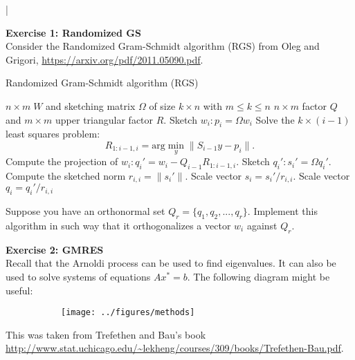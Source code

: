 \documentclass[11pt]{article}
\begin{document}
\lstset{frameround=fttt,language=Matlab}

\lstMakeShortInline[columns=fixed]|



{\bf{Exercise 1: Randomized GS}} \\

Consider the Randomized Gram-Schmidt algorithm (RGS) from Oleg and Grigori, \url{https://arxiv.org/pdf/2011.05090.pdf}.

\scriptsize
\begin{algorithm}
\caption{Randomized Gram-Schmidt algorithm (RGS)}\label{RGS}
\begin{algorithmic}
\Input $n \times m \; W$ and sketching matrix $\Omega$ of size $k \times n$ with $m \leq k \leq n$
\Output $n \times m$ factor $Q$ and $m \times m$ upper triangular factor $R$.
    \State Sketch $w_i: p_i = \Omega w_i$
    \State Solve the $k \times (i-1)$ least squares problem:
    \[ R_{1:i-1, i} = \text{arg}\min_{y} \|S_{i-1}y - p_i\|. \]
    \State Compute the projection of $w_i: q_i' = w_i - Q_{i-1}R_{1:i-1, i}$.
    \State Sketch $q_i' : s_i' = \Omega q_i'$.
    \State Compute the sketched norm $r_{i,i} = \|s_i'\|$.
    \State Scale vector $s_i = s_i'/r_{i,i}$.
    \State Scale vector $q_i = q_i'/r_{i,i}$
\EndFor
\end{algorithmic}
\end{algorithm}
\normalsize

Suppose you have an orthonormal set $Q_r = \{q_1, q_2, ..., q_r\}$. Implement this algorithm in such way that it orthogonalizes a vector $w_i$ against $Q_r$.

\bigskip

{\bf{Exercise 2: GMRES}} \\

Recall that the Arnoldi process can be used to find eigenvalues. It can also be used to solve systems of equations $Ax^* = b$. The following diagram might be useful:

\begin{figure}[H]
     \centering
     \begin{subfigure}[b]{0.5\textwidth}
         \centering
         \texttt{[image: ../figures/methods]}
     \end{subfigure}
\end{figure}

This was taken from Trefethen and Bau's book \url{http://www.stat.uchicago.edu/~lekheng/courses/309/books/Trefethen-Bau.pdf}.\\
\end{document}
